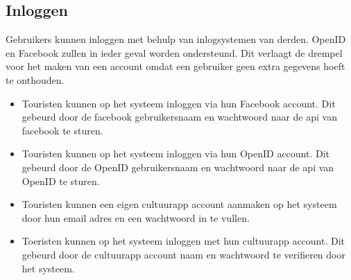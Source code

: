 \documentclass[a4paper,10pt]{article}
\begin{document}
            \subsection{Inloggen}
            Gebruikers kunnen inloggen met behulp van inlogsystemen van derden. OpenID en Facebook zullen in ieder geval worden ondersteund. Dit verlaagt de drempel voor het maken van een account omdat een gebruiker geen extra gegevens hoeft te onthouden.
\begin{itemize}
\item Touristen kunnen op het systeem inloggen via hun Facebook account. Dit gebeurd door de facebook gebruikersnaam en wachtwoord naar de api van facebook te sturen.
\item Touristen kunnen op het systeem inloggen via hun OpenID account. Dit gebeurd door de OpenID gebruikersnaam en wachtwoord naar de api van OpenID te sturen.
\item Touristen kunnen een eigen cultuurapp account aanmaken op het systeem door hun email adres en een wachtwoord in te vullen.
\item Toeristen kunnen op het systeem inloggen met hun cultuurapp account. Dit gebeurd door de cultuurapp account naam en wachtwoord te verifieren door het systeem.
\end{itemize}
		
		\clearpage
\end{document}
